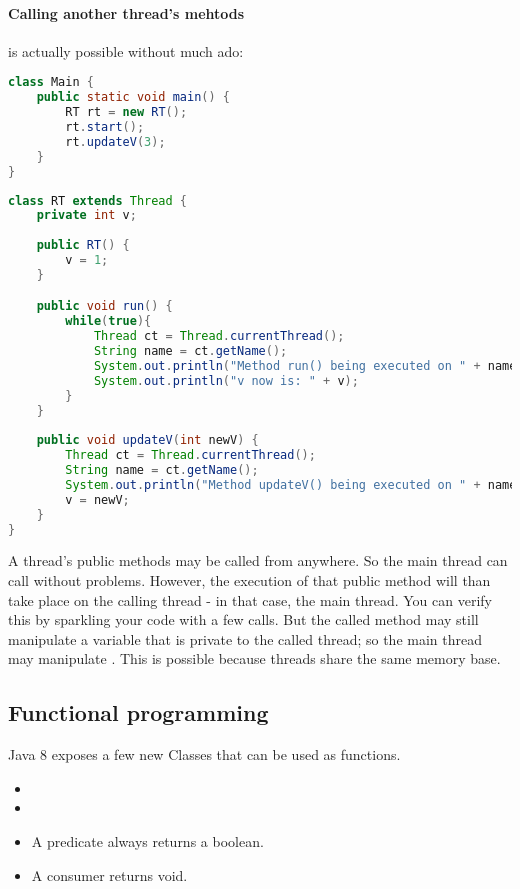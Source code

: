\paragraph{Calling another thread's mehtods} is actually possible without much ado: 
\begin{lstlisting}[language=java]
class Main {
    public static void main() {
        RT rt = new RT();
        rt.start();
        rt.updateV(3);
    }
}
\end{lstlisting}
\begin{lstlisting}[language=java]
class RT extends Thread {
    private int v; 
    
    public RT() {
        v = 1;
    }

    public void run() {
        while(true){
            Thread ct = Thread.currentThread();
            String name = ct.getName();
            System.out.println("Method run() being executed on " + name);
            System.out.println("v now is: " + v);
        }
    }
    
    public void updateV(int newV) {
        Thread ct = Thread.currentThread();
        String name = ct.getName();
        System.out.println("Method updateV() being executed on " + name);
        v = newV;
    }
}
\end{lstlisting}
A thread's public methods may be called from anywhere. So the main thread can call  without problems.  However, the execution of that public method will than take place on the calling thread - in that case, the main thread. You can verify this by sparkling your code with a few  calls. But the called method may still manipulate a variable that is private to the called thread; so the main thread may manipulate . This is possible because threads share the same memory base. 

\subsection{Functional programming}

Java 8 exposes a few new Classes that can be used as functions. 
\begin{itemize}
    \item {}
    \item {}
    \item {} A predicate always returns a boolean.
    \item {} A consumer returns void. 
\end{itemize}

